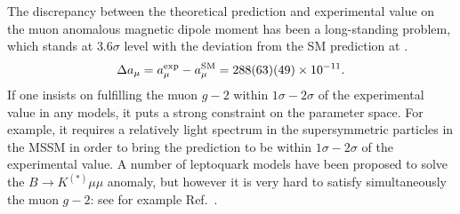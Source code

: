 \documentclass[%
showkeys,12pt,
preprint,preprintnumbers,nofootinbib,
groupedaddress,superscriptaddress,amsmath,amssymb]{revtex4}
\numberwithin{equation}{section}
\begin{document}
The discrepancy between the theoretical prediction and experimental value on
the muon anomalous magnetic dipole moment has been a long-standing 
problem, which stands at $3.6\sigma$ level with the deviation from the 
SM prediction at \cite{pdg}. 
\begin{equation*}
 \Delta a_\mu  = a_\mu^{\rm exp}  - a_\mu^{\rm SM} = 288(63)(49) \times 10^{-11}. %
\end{equation*}
If one insists on fulfilling the muon $g-2$ within $1\sigma-2\sigma$ of the
experimental value in any models, it puts a strong constraint on the
parameter space. For example, it requires a relatively light spectrum
in the supersymmetric particles in the MSSM  in order to bring the 
prediction to be within $1\sigma-2\sigma$ of the experimental value.
A number of leptoquark models have been proposed to solve the
$B\to K^{(*)}\mu\mu$ anomaly, but however it is very hard to satisfy simultaneously
the muon $g-2$: see for example Ref.~\cite{Cheung:2016fjo}.
\end{document}
